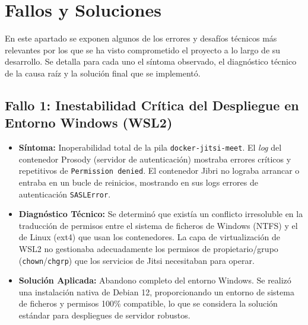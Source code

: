 \section{Fallos y Soluciones}
\label{sec:fallos_soluciones}
En este apartado se exponen algunos de los errores y desafíos técnicos más relevantes por los que se ha visto comprometido el proyecto a lo largo de su desarrollo. Se detalla para cada uno el síntoma observado, el diagnóstico técnico de la causa raíz y la solución final que se implementó.

\subsection{Fallo 1: Inestabilidad Crítica del Despliegue en Entorno Windows (WSL2)}
\begin{itemize}
    \item \textbf{Síntoma:} Inoperabilidad total de la pila \texttt{docker-jitsi-meet}. El \textit{log} del contenedor Prosody (servidor de autenticación) mostraba errores críticos y repetitivos de \texttt{Permission denied}. El contenedor Jibri no lograba arrancar o entraba en un bucle de reinicios, mostrando en sus logs errores de autenticación \texttt{SASLError}.
    
    \item \textbf{Diagnóstico Técnico:} Se determinó que existía un conflicto irresoluble en la traducción de permisos entre el sistema de ficheros de Windows (NTFS) y el de Linux (ext4) que usan los contenedores. La capa de virtualización de WSL2 no gestionaba adecuadamente los permisos de propietario/grupo (\texttt{chown}/\texttt{chgrp}) que los servicios de Jitsi necesitaban para operar.
    
    \item \textbf{Solución Aplicada:} Abandono completo del entorno Windows. Se realizó una instalación nativa de Debian 12, proporcionando un entorno de sistema de ficheros y permisos 100\% compatible, lo que se considera la solución estándar para despliegues de servidor robustos.
\end{itemize}

